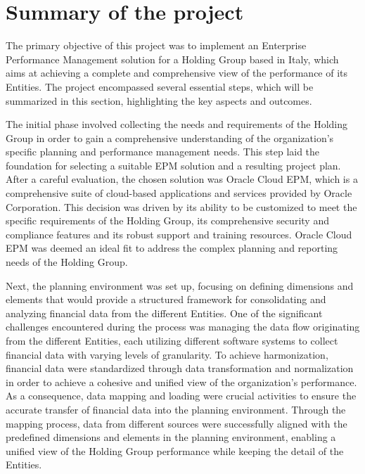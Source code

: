 \documentclass[12pt,a4paper,openright,twoside]{book}
\begin{document}
\section{Summary of the project}

The primary objective of this project was to implement an Enterprise Performance Management solution for a Holding Group based in Italy, which aims at achieving a complete and comprehensive view of the performance of its Entities. 
%
The project encompassed several essential steps, which will be summarized in this section, highlighting the key aspects and outcomes.

The initial phase involved collecting the needs and requirements of the Holding Group in order to gain a comprehensive understanding of the organization's specific planning and performance management needs.
%
This step laid the foundation for selecting a suitable EPM solution and a resulting project plan.
%
After a careful evaluation, the chosen solution was Oracle Cloud EPM, which is a comprehensive suite of cloud-based applications and services provided by Oracle Corporation.
%
This decision was driven by its ability to be customized to meet the specific requirements of the Holding Group, its comprehensive security and compliance features and its robust support and training resources. 
%
Oracle Cloud EPM was deemed an ideal fit to address the complex planning and reporting needs of the Holding Group.

Next, the planning environment was set up, focusing on defining dimensions and elements that would provide a structured framework for consolidating and analyzing financial data from the different Entities. 
%
One of the significant challenges encountered during the process was managing the data flow originating from the different Entities, each utilizing different software systems to collect financial data with varying levels of granularity. 
%
To achieve harmonization, financial data were standardized through data transformation and normalization in order to achieve a cohesive and unified view of the organization's performance.
%
As a consequence, data mapping and loading were crucial activities to ensure the accurate transfer of financial data into the planning environment. 
%
Through the mapping process, data from different sources were successfully aligned with the predefined dimensions and elements in the planning environment, enabling a unified view of the Holding Group performance while keeping the detail of the Entities.
\end{document}
